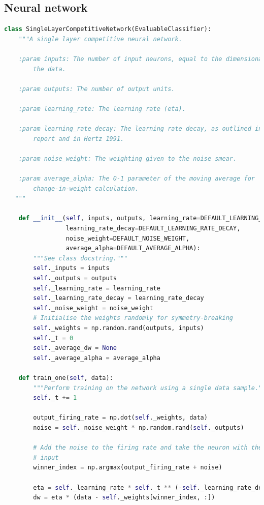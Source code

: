 \documentclass[a4paper, 11pt, twocolumn, final]{article} %
\begin{document}
\subsection{Neural network}
\begin{lstlisting}[language=Python, style=python]
class SingleLayerCompetitiveNetwork(EvaluableClassifier):
    """A single layer competitive neural network.

    :param inputs: The number of input neurons, equal to the dimensionality of
        the data.

    :param outputs: The number of output units.

    :param learning_rate: The learning rate (eta).

    :param learning_rate_decay: The learning rate decay, as outlined in the
        report and in Hertz 1991.

    :param noise_weight: The weighting given to the noise smear.

    :param average_alpha: The 0-1 parameter of the moving average for
        change-in-weight calculation.
   """

    def __init__(self, inputs, outputs, learning_rate=DEFAULT_LEARNING_RATE,
                 learning_rate_decay=DEFAULT_LEARNING_RATE_DECAY,
                 noise_weight=DEFAULT_NOISE_WEIGHT,
                 average_alpha=DEFAULT_AVERAGE_ALPHA):
        """See class docstring."""
        self._inputs = inputs
        self._outputs = outputs
        self._learning_rate = learning_rate
        self._learning_rate_decay = learning_rate_decay
        self._noise_weight = noise_weight
        # Initialise the weights randomly for symmetry-breaking
        self._weights = np.random.rand(outputs, inputs)
        self._t = 0
        self._average_dw = None
        self._average_alpha = average_alpha

    def train_one(self, data):
        """Perform training on the network using a single data sample."""
        self._t += 1

        output_firing_rate = np.dot(self._weights, data)
        noise = self._noise_weight * np.random.rand(self._outputs)

        # Add the noise to the firing rate and take the neuron with the largest
        # input
        winner_index = np.argmax(output_firing_rate + noise)

        eta = self._learning_rate * self._t ** (-self._learning_rate_decay)
        dw = eta * (data - self._weights[winner_index, :])


\end{lstlisting}
\end{document}
